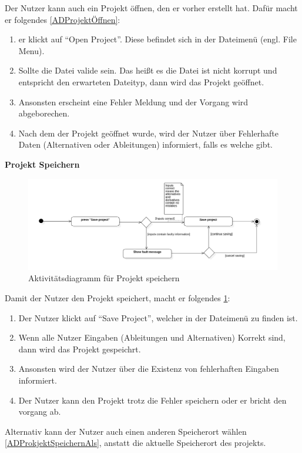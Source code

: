 \documentclass{article}
\begin{document}
Der Nutzer kann auch ein Projekt öffnen, den er vorher erstellt hat. Dafür macht er folgendes \ref{ADProjektÖffnen}:
\begin{enumerate}
    \item[1.] er klickt auf \enquote{Open Project}. Diese befindet sich in der Dateimenü (engl. File Menu).
    \item[2.] Sollte die Datei valide sein. Das heißt es die Datei ist nicht korrupt und entspricht den erwarteten Dateityp, dann wird das Projekt geöffnet.
    \item[3.] Ansonsten erscheint eine Fehler Meldung und der Vorgang wird abgeborechen.
    \item[4.] Nach dem der Projekt geöffnet wurde, wird der Nutzer über Fehlerhafte Daten (Alternativen oder Ableitungen) informiert, falls es welche gibt. 
\end{enumerate}

\textbf{\large{Projekt Speichern}}
\begin{figure}[H]%
    \centering
    \includegraphics[width=13cm]{entwurf/Entwurf_dokument/img/Alissa/SaveProjectAD.png}
    \caption{Aktivitätsdiagramm für Projekt speichern}
    \label{ADProjekt Speichern}
\end{figure}
Damit der Nutzer den Projekt speichert, macht er folgendes \ref{ADProjekt Speichern}:
\begin{enumerate}
    \item[1.] Der Nutzer klickt auf \enquote{Save Project}, welcher in der Dateimenü zu finden ist.
    \item[2.] Wenn alle Nutzer Eingaben (Ableitungen und Alternativen) Korrekt sind, dann wird das Projekt gespeichrt.
    \item[3.] Ansonsten wird der Nutzer über die Existenz von fehlerhaften Eingaben informiert.
    \item[3.] Der Nutzer kann den Projekt trotz die Fehler speichern oder er bricht den vorgang ab.
\end{enumerate}
Alternativ kann der Nutzer auch einen anderen Speicherort wählen \ref{ADProkjektSpeichernAls}, anstatt die aktuelle Speicherort des projekts.
\end{document}
